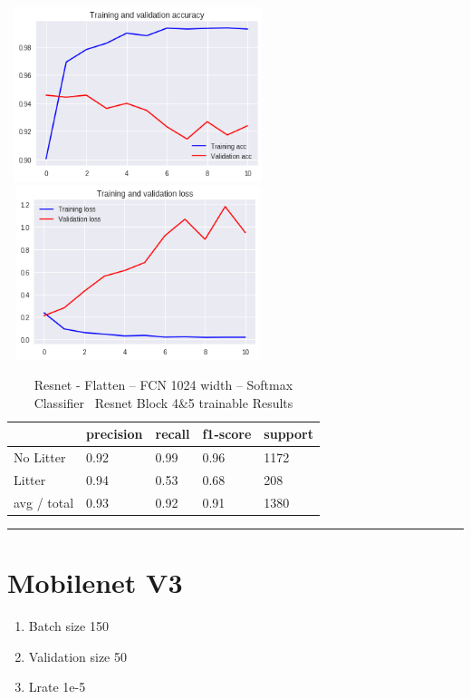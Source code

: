 \documentclass{IEEEtran}
\begin{document}
 \includegraphics[width=3in,height=2in]{resnet-img/resnet-img013.png} 
\includegraphics[width=3in,height=2in]{resnet-img/resnet-img014.png} 


\bigskip

\begin{table}[ht]
\centering
\caption{Resnet - Flatten -- FCN 1024 width -- Softmax Classifier \ Resnet Block 4\&5 trainable Results}
\begin{tabular}{|l|l|l|l|l|} 
\hline
 & precision & recall  & f1-score  & support \\\hline
No Litter  &
0.92  &
0.99  &
0.96  &
1172 \\\hline
Litter  &
0.94  &
0.53  &
0.68  &
208 \\\hline
avg / total  &
0.93  &
0.92  &
0.91  &
1380\\\hline
\end{tabular}
\end{table}

\begin{center}\noindent\rule{8cm}{0.4pt}\end{center}



\section{Mobilenet V3}


\bigskip

\begin{enumerate}
\item Batch size 150
\item Validation size 50
\item Lrate 1e-5
\end{enumerate}
\end{document}
